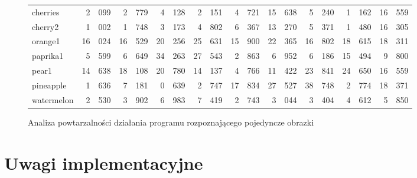 \documentclass[a4paper,12pt,leqno]{article}
\begin{document}
\begin{figure}
{\begin{tabular}{|l|r@{.}lr@{.}lr@{.}lr@{.}lr@{.}lr@{.}lr@{.}lr@{.}lr@{.}l|}
cherries   &  2&099 &  2&779 &  4&128 &  2&151 &  4&721 & 15&638 &  5&240 &  1&162 & 16&559 \\
cherry2    &  1&002 &  1&748 &  3&173 &  4&802 &  6&367 & 13&270 &  5&371 &  1&480 & 16&305 \\
orange1    & 16&024 & 16&529 & 20&256 & 25&631 & 15&900 & 22&365 & 16&802 & 18&615 & 18&311 \\
paprika1   &  5&599 &  6&649 & 34&263 & 27&543 &  2&863 &  6&952 &  6&186 & 15&494 &  9&800 \\
pear1      & 14&638 & 18&108 & 20&780 & 14&137 &  4&766 & 11&422 & 23&841 & 24&650 & 16&559 \\
pineapple  &  1&636 &  7&181 &  0&639 &  2&747 & 17&834 & 27&527 & 38&748 &  2&774 & 18&371 \\
watermelon &  2&530 &  3&902 &  6&983 &  7&419 &  2&743 &  3&044 &  3&404 &  4&612 &  5&850 \\ \hline
\end{tabular}}
\normalsize\caption{Analiza powtarzalności działania programu rozpoznającego pojedyncze obrazki}
\end{figure}

\section{Uwagi implementacyjne}
\end{document}
